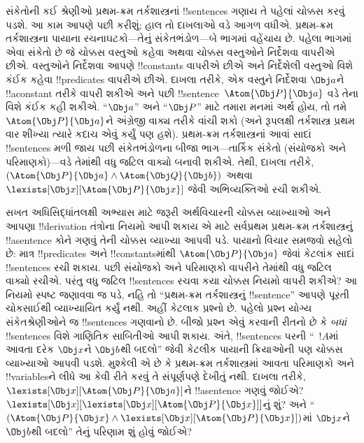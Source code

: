\documentclass[../../../include/open-logic-section]{subfiles}
\begin{document}


સંકેતોની કઈ શ્રેણીઓ પ્રથમ-ક્રમ તર્કશાસ્ત્રનાં !!{sentence}s ગણાય તે
પહેલાં ચોક્કસ કરવું પડશે. આ કામ આપણે પછી કરીશું; હાલ તો દાખલાઓ વડે
આગળ વધીએ. પ્રથમ-ક્રમ તર્કશાસ્ત્રના પાયાના રચનાઘટકો---તેનું
સંકેતભંડોળ---બે ભાગમાં વહેંચાય છે. પહેલા ભાગમાં એવા સંકેતો છે જે
ચોક્કસ વસ્તુઓ કહેવા અથવા ચોક્કસ વસ્તુઓને નિર્દેશવા વાપરીએ છીએ.
વસ્તુઓને નિર્દેશવા આપણે !!{constant}s વાપરીએ છીએ અને નિર્દેશેલી
વસ્તુઓ વિશે કંઈક કહેવા !!{predicate}s વાપરીએ છીએ. દાખલા તરીકે, એક
વસ્તુને નિર્દેશવા $\Obj a$ને !!a{constant} તરીકે વાપરી શકીએ અને પછી
!!{sentence}~$\Atom{\Obj P}{\Obj a}$ વડે તેના વિશે કંઈક કહી શકીએ.
``$\Obj a$'' અને ``$\Obj P$'' માટે તમારા મનમાં અર્થ હોય, તો તમે
$\Atom{\Obj P}{\Obj a}$ને અંગ્રેજી વાક્ય તરીકે વાંચી શકો (અને
રૂપલક્ષી તર્કશાસ્ત્ર પ્રથમ વાર શીખ્યા ત્યારે કદાચ એવું કર્યું પણ હશે).
પ્રથમ-ક્રમ તર્કશાસ્ત્રનાં આવાં સાદાં !!{sentence}s મળી જાય પછી
સંકેતભંડોળના બીજા ભાગ---તાર્કિક સંકેતો (સંયોજકો અને પરિમાણકો)---વડે
તેમાંથી વધુ જટિલ વાક્યો બનાવી શકીએ. તેથી, દાખલા તરીકે,
$(\Atom{\Obj P}{\Obj a} \land \Atom{\Obj Q}{\Obj b})$ અથવા
~$\lexists[\Obj x][\Atom{\Obj P}{\Obj x}]$ જેવી અભિવ્યક્તિઓ રચી શકીએ.

સખત અધિસિદ્ધાંતલક્ષી અભ્યાસ માટે જરૂરી અર્થવિચારની ચોક્કસ વ્યાખ્યાઓ
અને આપણા !!{derivation} તંત્રોના નિયમો આપી શકાય એ માટે સર્વપ્રથમ
પ્રથમ-ક્રમ તર્કશાસ્ત્રનું !!a{sentence} કોને ગણવું તેની ચોક્કસ વ્યાખ્યા
આપવી પડે. પાયાનો વિચાર સમજવો સહેલો છે: માત્ર !!{predicate}s અને
!!{constant}sમાંથી $\Atom{\Obj P}{\Obj a}$ જેવાં કેટલાંક સાદાં
!!{sentence}s રચી શકાય. પછી સંયોજકો અને પરિમાણકો વાપરીને તેમાંથી વધુ
જટિલ વાક્યો રચીએ. પરંતુ વધુ જટિલ !!{sentence}s રચવા કયા ચોક્કસ નિયમો
વાપરી શકીએ? આ નિયમો સ્પષ્ટ જણાવવા જ પડે, નહિ તો ``પ્રથમ-ક્રમ
તર્કશાસ્ત્રનું !!{sentence}'' આપણે પૂરતી ચોકસાઈથી વ્યાખ્યાયિત કર્યું
નથી. અહીં કેટલાક પ્રશ્નો છે. પહેલો પ્રશ્ન યોગ્ય સંકેતશ્રેણીઓને જ
!!{sentence}s ગણવાનો છે. બીજો પ્રશ્ન એવું કરવાની રીતનો છે કે
\emph{બધાં} !!{sentence}s વિશે ગાણિતિક સાબિતીઓ આપી શકાય. અંતે,
!!{sentence}s પરની ``~$!A$માં આવતા દરેક $\Obj x$ને $\Obj b$થી બદલો''
જેવી કેટલીક પાયાની ક્રિયાઓની પણ ચોક્કસ વ્યાખ્યાઓ આપવી પડશે. મુશ્કેલી એ
છે કે પ્રથમ-ક્રમ તર્કશાસ્ત્રમાં આવતા પરિમાણકો અને !!{variable}sને લીધે
આ કેવી રીતે કરવું તે સંપૂર્ણપણે દેખીતું નથી. દાખલા તરીકે,
$\lexists[\Obj x][\Atom{\Obj P}{\Obj a}]$ને !!a{sentence} ગણવું જોઈએ?
$\lexists[\Obj x][\lexists[\Obj x][\Atom{\Obj P}{\Obj x}]]$નું શું?
અને ``$(\Atom{\Obj P}{\Obj x} \land \lexists[\Obj x][\Atom{\Obj
P}{\Obj x}])$માં $\Obj x$ને $\Obj b$થી બદલો'' તેનું પરિણામ શું હોવું
જોઈએ?
\end{document}

